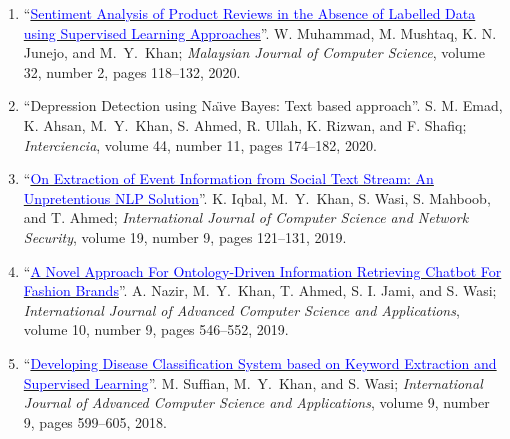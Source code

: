 \documentclass[a4paper, 10pt]{article}
\begin{document}
\begin{enumerate}
\item ``\href{https://doi.org/10.22452/mjcs.vol33no2.3}{\textcolor{blue}{Sentiment Analysis of Product Reviews in the Absence of Labelled Data using Supervised Learning Approaches}}''. W. Muhammad, M. Mushtaq, K. N. Junejo, and \textcolor{NavyBlue}{M.~Y.~Khan}; \emph{Malaysian Journal of Computer Science}, volume 32, number 2, pages 118--132, 2020. \qthreetag{\textcolor{white}{\bfseries Q3}}  

\item ``Depression Detection using Na\"{\i}ve Bayes: Text based approach''. S. M. Emad, K. Ahsan, \textcolor{NavyBlue}{M.~Y.~Khan}, S. Ahmed, R. Ullah, K. Rizwan, and F. Shafiq; \emph{Interciencia}, volume 44, number 11, pages 174--182, 2020. \qtwotag{\textcolor{white}{\bfseries Q2}}  

\item ``\href{http://paper.ijcsns.org/07_book/201909/20190915.pdf}{\textcolor{blue}{On Extraction of Event Information from Social Text Stream: An Unpretentious NLP Solution}}''. K. Iqbal, \textcolor{NavyBlue}{M.~Y.~Khan}, S. Wasi, S. Mahboob, and T. Ahmed; \emph{International Journal of Computer Science and Network Security}, volume 19, number 9, pages 121--131, 2019.  

\item ``\href{https://doi.org/10.14569/IJACSA.2019.0100972}{\textcolor{blue}{A Novel Approach For Ontology-Driven Information Retrieving Chatbot For Fashion Brands}}''. A. Nazir, \textcolor{NavyBlue}{M.~Y.~Khan}, T. Ahmed, S. I. Jami, and S. Wasi; \emph{International Journal of Advanced Computer Science and Applications}, volume 10, number 9, pages 546--552, 2019. \qthreetag{\textcolor{white}{\bfseries Q3}} 

\item ``\href{https://doi.org/10.14569/IJACSA.2018.090976}{\textcolor{blue}{Developing Disease Classification System based on Keyword Extraction and Supervised Learning}}''. M. Suffian, \textcolor{NavyBlue}{M.~Y.~Khan}, and S. Wasi; \emph{International Journal of Advanced Computer Science and Applications}, volume 9, number 9, pages 599--605, 2018. %
\end{enumerate}
\end{document}
